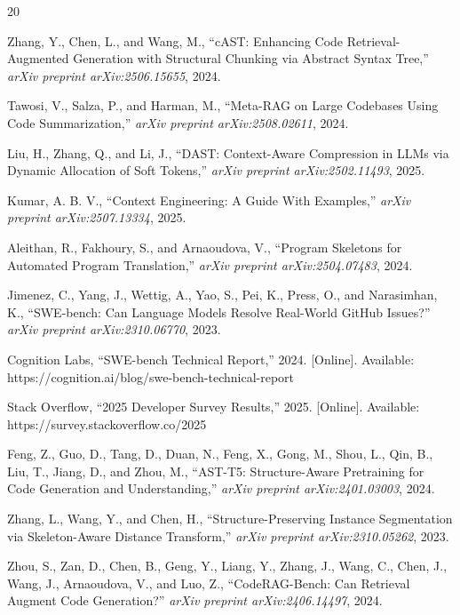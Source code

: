 \documentclass[conference]{IEEEtran}
\begin{document}
\begin{thebibliography}{20}

Zhang, Y., Chen, L., and Wang, M., ``cAST: Enhancing Code Retrieval-Augmented Generation with Structural Chunking via Abstract Syntax Tree,'' \textit{arXiv preprint arXiv:2506.15655}, 2024.

Tawosi, V., Salza, P., and Harman, M., ``Meta-RAG on Large Codebases Using Code Summarization,'' \textit{arXiv preprint arXiv:2508.02611}, 2024.

Liu, H., Zhang, Q., and Li, J., ``DAST: Context-Aware Compression in LLMs via Dynamic Allocation of Soft Tokens,'' \textit{arXiv preprint arXiv:2502.11493}, 2025.

Kumar, A. B. V., ``Context Engineering: A Guide With Examples,'' \textit{arXiv preprint arXiv:2507.13334}, 2025.

Aleithan, R., Fakhoury, S., and Arnaoudova, V., ``Program Skeletons for Automated Program Translation,'' \textit{arXiv preprint arXiv:2504.07483}, 2024.

Jimenez, C., Yang, J., Wettig, A., Yao, S., Pei, K., Press, O., and Narasimhan, K., ``SWE-bench: Can Language Models Resolve Real-World GitHub Issues?'' \textit{arXiv preprint arXiv:2310.06770}, 2023.

Cognition Labs, ``SWE-bench Technical Report,'' 2024. [Online]. Available: https://cognition.ai/blog/swe-bench-technical-report

Stack Overflow, ``2025 Developer Survey Results,'' 2025. [Online]. Available: https://survey.stackoverflow.co/2025

Feng, Z., Guo, D., Tang, D., Duan, N., Feng, X., Gong, M., Shou, L., Qin, B., Liu, T., Jiang, D., and Zhou, M., ``AST-T5: Structure-Aware Pretraining for Code Generation and Understanding,'' \textit{arXiv preprint arXiv:2401.03003}, 2024.

Zhang, L., Wang, Y., and Chen, H., ``Structure-Preserving Instance Segmentation via Skeleton-Aware Distance Transform,'' \textit{arXiv preprint arXiv:2310.05262}, 2023.

Zhou, S., Zan, D., Chen, B., Geng, Y., Liang, Y., Zhang, J., Wang, C., Chen, J., Wang, J., Arnaoudova, V., and Luo, Z., ``CodeRAG-Bench: Can Retrieval Augment Code Generation?'' \textit{arXiv preprint arXiv:2406.14497}, 2024.


\end{thebibliography}
\end{document}
